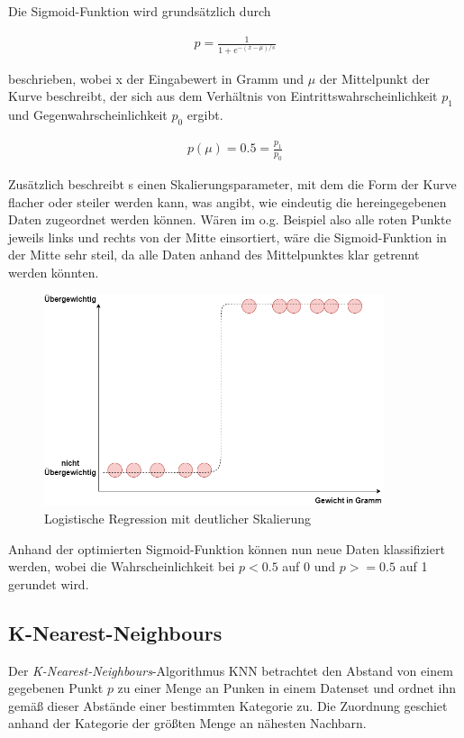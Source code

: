 Die Sigmoid-Funktion wird grundsätzlich durch

\begin{align}
    p = \frac{1}{1 + e^{-(x-\mu)/s}}
\end{align}

beschrieben, wobei x der Eingabewert in Gramm und $\mu$ der Mittelpunkt der Kurve beschreibt, der sich aus dem 
Verhältnis von Eintrittswahrscheinlichkeit $p_1$ und Gegenwahrscheinlichkeit $p_0$ ergibt.

\begin{align}
    p(\mu) = 0.5 = \frac{p_1}{p_0}   
\end{align}

Zusätzlich beschreibt s einen Skalierungsparameter, mit dem die Form der Kurve flacher oder steiler werden kann,
was angibt, wie eindeutig die hereingegebenen Daten zugeordnet werden können. Wären im o.g. Beispiel also alle roten
Punkte jeweils links und rechts von der Mitte einsortiert, wäre die Sigmoid-Funktion in der Mitte sehr steil, da alle
Daten anhand des Mittelpunktes klar getrennt werden könnten.\newpage

\begin{figure}[h]
    \centering
    \includegraphics[width=10.0cm]{pic/logistic_regression_high s.png}
    \caption{Logistische Regression mit deutlicher Skalierung}
    \label{fig:SVC_2D}
\end{figure}

Anhand der optimierten Sigmoid-Funktion können nun neue Daten klassifiziert werden, wobei die Wahrscheinlichkeit
bei $p < 0.5$ auf 0 und $p >= 0.5$ auf 1 gerundet wird.

\subsection{K-Nearest-Neighbours}
Der \textit{K-Nearest-Neighbours}-Algorithmus KNN betrachtet den Abstand von einem gegebenen Punkt $p$ zu einer 
Menge an Punken in einem Datenset und ordnet ihn gemäß dieser Abstände einer bestimmten Kategorie zu. Die 
Zuordnung geschiet anhand der Kategorie der größten Menge an nähesten Nachbarn.


